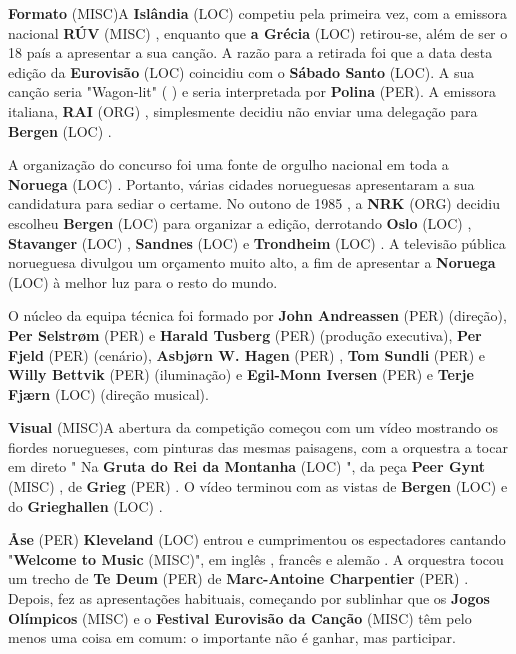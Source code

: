 \documentclass[12pt,a4paper]{article}
\begin{document}
\textbf{Formato} (MISC)A \textbf{Islândia} (LOC) competiu pela primeira vez, com a emissora nacional \textbf{RÚV} (MISC) , enquanto que \textbf{a Grécia} (LOC) retirou-se, além de ser o 18 país a apresentar a sua canção. A razão para a retirada foi que a data desta edição da \textbf{Eurovisão} (LOC) coincidiu com o \textbf{Sábado Santo} (LOC). A sua canção seria "Wagon-lit" ( ) e seria interpretada por \textbf{Polina} (PER). A emissora italiana, \textbf{RAI} (ORG) , simplesmente decidiu não enviar uma delegação para \textbf{Bergen} (LOC) .

A organização do concurso foi uma fonte de orgulho nacional em toda a \textbf{Noruega} (LOC) . Portanto, várias cidades norueguesas apresentaram a sua candidatura para sediar o certame. No outono de 1985 , a \textbf{NRK} (ORG) decidiu escolheu \textbf{Bergen} (LOC) para organizar a edição, derrotando \textbf{Oslo} (LOC) , \textbf{Stavanger} (LOC) , \textbf{Sandnes} (LOC) e \textbf{Trondheim} (LOC) . A televisão pública norueguesa divulgou um orçamento muito alto, a fim de apresentar a \textbf{Noruega} (LOC) à melhor luz para o resto do mundo.

O núcleo da equipa técnica foi formado por \textbf{John Andreassen} (PER) (direção), \textbf{Per Selstrøm} (PER) e \textbf{Harald Tusberg} (PER) (produção executiva), \textbf{Per Fjeld} (PER) (cenário), \textbf{Asbjørn W. Hagen} (PER) , \textbf{Tom Sundli} (PER) e \textbf{Willy Bettvik} (PER) (iluminação) e \textbf{Egil-Monn Iversen} (PER) e \textbf{Terje Fjærn} (LOC) (direção musical).



\textbf{Visual} (MISC)A abertura da competição começou com um vídeo mostrando os fiordes noruegueses, com pinturas das mesmas paisagens, com a orquestra a tocar em direto " Na \textbf{Gruta do Rei da Montanha} (LOC) ", da peça \textbf{Peer Gynt} (MISC) , de \textbf{Grieg} (PER) . O vídeo terminou com as vistas de \textbf{Bergen} (LOC) e do \textbf{Grieghallen} (LOC) .

\textbf{Åse} (PER) \textbf{Kleveland} (LOC) entrou e cumprimentou os espectadores cantando "\textbf{Welcome to Music} (MISC)", em inglês , francês e alemão . A orquestra tocou um trecho de \textbf{Te Deum} (PER) de \textbf{Marc-Antoine Charpentier} (PER) . Depois, fez as apresentações habituais, começando por sublinhar que os \textbf{Jogos Olímpicos} (MISC) e o \textbf{Festival Eurovisão da Canção} (MISC) têm pelo menos uma coisa em comum: o importante não é ganhar, mas participar.
\end{document}
